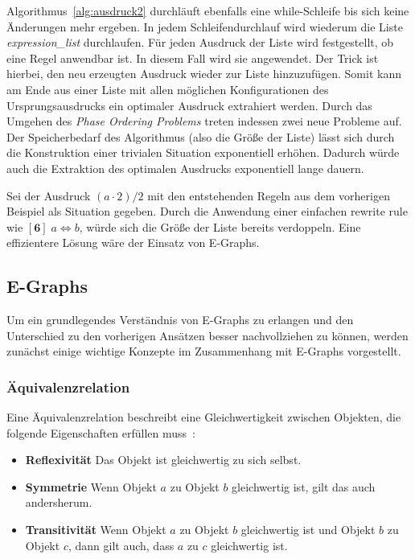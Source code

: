 Algorithmus~\ref{alg:ausdruck2} durchläuft ebenfalls eine while-Schleife bis sich keine Änderungen mehr ergeben. In jedem Schleifendurchlauf wird wiederum die Liste \textit{expression\_list} durchlaufen.
Für jeden Ausdruck der Liste wird festgestellt, ob eine Regel anwendbar ist. In diesem Fall wird sie angewendet. Der Trick ist hierbei, den neu erzeugten Ausdruck wieder zur Liste 
hinzuzufügen. Somit kann am Ende aus einer Liste mit allen möglichen Konfigurationen des Ursprungsausdrucks ein optimaler Ausdruck extrahiert werden.
Durch das Umgehen des \textit{Phase Ordering Problems} treten indessen zwei neue Probleme auf.
Der Speicherbedarf des Algorithmus (also die Größe der Liste) lässt sich durch die Konstruktion einer trivialen Situation exponentiell erhöhen.
Dadurch würde auch die Extraktion des optimalen Ausdrucks exponentiell lange dauern.

Sei der Ausdruck $(a \cdot 2) / 2$ mit den entstehenden Regeln aus dem vorherigen Beispiel als Situation gegeben. Durch die Anwendung einer einfachen rewrite rule wie 
$[\mathbf{6}]\; a \Leftrightarrow b$, würde sich die Größe der Liste bereits verdoppeln.
Eine effizientere Lösung wäre der Einsatz von E-Graphs.

\subsection{E-Graphs}\label{subsec:egraphs}

Um ein grundlegendes Verständnis von E-Graphs zu erlangen und den Unterschied zu den vorherigen Ansätzen besser nachvollziehen zu können,
werden zunächst einige wichtige Konzepte im Zusammenhang mit E-Graphs vorgestellt. 

\subsubsection{Äquivalenzrelation}

Eine Äquivalenzrelation beschreibt eine Gleichwertigkeit zwischen Objekten, die folgende Eigenschaften erfüllen muss~\cite{Ehrig2001}:

\begin{itemize}
  \item \textbf{Reflexivität} Das Objekt ist gleichwertig zu sich selbst.
  \item \textbf{Symmetrie} Wenn Objekt $a$ zu Objekt $b$ gleichwertig ist, gilt das auch andersherum.
  \item \textbf{Transitivität} Wenn Objekt $a$ zu Objekt $b$ gleichwertig ist und Objekt $b$ zu Objekt $c$, dann gilt auch, dass $a$ zu $c$ gleichwertig ist.
\end{itemize}

